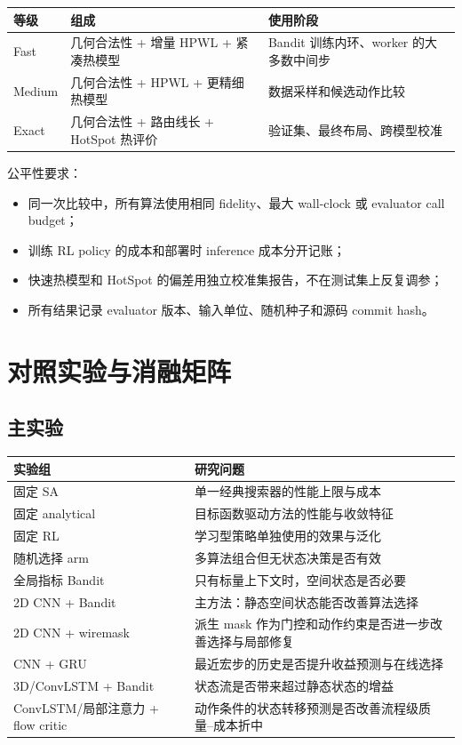\documentclass[UTF8,a4paper,11pt]{ctexart}
\begin{document}
\begin{table}[htbp]
\centering
\small
\begin{tabularx}{\textwidth}{p{}p{}X}
\toprule
等级 & 组成 & 使用阶段 \\
\midrule
Fast & 几何合法性 + 增量 HPWL + 紧凑热模型 & Bandit 训练内环、worker 的大多数中间步 \\
Medium & 几何合法性 + HPWL + 更精细热模型 & 数据采样和候选动作比较 \\
Exact & 几何合法性 + 路由线长 + HotSpot 热评价 & 验证集、最终布局、跨模型校准 \\
\bottomrule
\end{tabularx}
\end{table}

公平性要求：

\begin{itemize}
    \item 同一次比较中，所有算法使用相同 fidelity、最大 wall-clock 或 evaluator call budget；
    \item 训练 RL policy 的成本和部署时 inference 成本分开记账；
    \item 快速热模型和 HotSpot 的偏差用独立校准集报告，不在测试集上反复调参；
    \item 所有结果记录 evaluator 版本、输入单位、随机种子和源码 commit hash。
\end{itemize}

\section{对照实验与消融矩阵}

\subsection{主实验}

\begin{table}[htbp]
\centering
\small
\begin{tabularx}{\textwidth}{p{}X}
\toprule
实验组 & 研究问题 \\
\midrule
固定 SA & 单一经典搜索器的性能上限与成本 \\
固定 analytical & 目标函数驱动方法的性能与收敛特征 \\
固定 RL & 学习型策略单独使用的效果与泛化 \\
随机选择 arm & 多算法组合但无状态决策是否有效 \\
全局指标 Bandit & 只有标量上下文时，空间状态是否必要 \\
2D CNN + Bandit & 主方法：静态空间状态能否改善算法选择 \\
2D CNN + wiremask & 派生 mask 作为门控和动作约束是否进一步改善选择与局部修复 \\
CNN + GRU & 最近宏步的历史是否提升收益预测与在线选择 \\
3D/ConvLSTM + Bandit & 状态流是否带来超过静态状态的增益 \\
ConvLSTM/局部注意力 + flow critic & 动作条件的状态转移预测是否改善流程级质量--成本折中 \\
\bottomrule
\end{tabularx}
\end{table}
\end{document}
